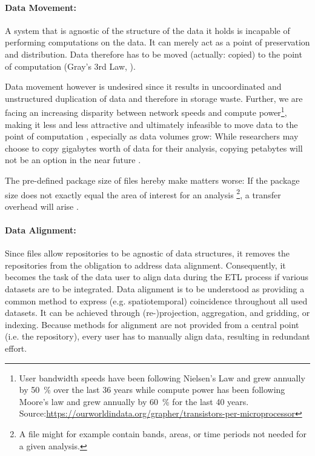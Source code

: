 \documentclass[a4paper,10pt]{article}
\begin{document}
\paragraph{Data Movement:}
A system that is agnostic of the structure of the data it holds is incapable of performing computations on the data. 
It can merely act as a point of preservation and distribution. Data therefore has to be moved (actually: copied) to the point of computation (Gray's 3rd Law, \cite{Szalay2009}).

Data movement however is undesired since it results in uncoordinated and unstructured duplication of data and therefore in storage waste.
Further, we are facing an increasing disparity between network speeds and compute power\footnote{User bandwidth speeds have been following Nielsen's Law \citep{Nielsen1998} and grew annually by \SI{50}{\percent} over the last 36 years while compute power has been following Moore's law \citep{Moore1975} and grew annually by \SI{60}{\percent} for the last 40 years. Source:\url{https://ourworldindata.org/grapher/transistors-per-microprocessor}}, making it less and less attractive and ultimately infeasible to move data to the point of computation \citep{Hey2009}, especially as data volumes grow: While researchers may choose to copy gigabytes worth of data for their analysis, copying petabytes will not be an option in the near future \citep{Szalay2006}.

The pre-defined package size of files hereby make matters worse: If the package size does not exactly equal the area of
interest for an analysis \footnote{A file might for example contain bands, areas, or time periods not needed for a given analysis.}, a transfer overhead will arise \citep{Gray2002}.

\paragraph{Data Alignment:}
Since files allow repositories to be agnostic of data structures, it removes the repositories from the obligation to address data alignment.
Consequently, it becomes the task of the data user to align data during the \gls{ETL} process if various datasets are to be integrated.
Data alignment is to be understood as providing a common method to express (e.g. spatiotemporal) coincidence throughout all used datasets.
It can be achieved through (re-)projection, aggregation, and gridding, or indexing.
Because methods for alignment are not provided from a central point (i.e. the repository), every user has to manually align data, resulting in redundant effort.
\end{document}
